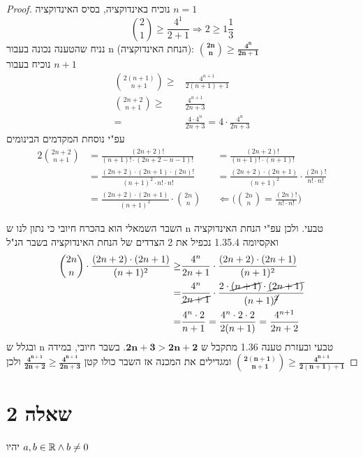\documentclass{article}
\begin{document}
	 \begin{proof}
		\nl
		נוכיח באינדוקציה, בסיס האינדוקציה
		$n = 1$
		\[
			{2 \choose 1} \geq \frac{4^1}{2+1} \Rightarrow 2 \geq 1 \frac{1}{3}
		\]
נניח שהטענה נכונה בעבור n (הנחת האינדוקציה):
		$\bm{{2n \choose n} \geq \frac{4^n}{2n+1}}$ \\
נוכיח בעבור $n + 1$
		\begin{align*}
			{2(n+1) \choose n+1} \geq &\frac{4^{n+1}}{2(n+1)+1} \\[1em]
			{2n + 2 \choose n + 1} \geq &\frac{4^{n+1}}{2n + 3} \\[1em]
			=&\frac{4 \cdot 4^n}{2n+3}
			=4 \cdot \frac{4^n}{2n+3}
		\end{align*}
עפ"י נוסחת המקדמים הבינומים
		\begin{alignat*}{2}
			{2n + 2 \choose n + 1} &=
			\frac{(2n+2)!}{(n+1)! \cdot (2n+2-n-1)!}
			&&=\frac{(2n+2)!}{(n+1)! \cdot (n+1)!} \\[1em]
			&=\frac{(2n+2) \cdot (2n+1) \cdot (2n)!}{(n+1)^2 \cdot n! \cdot n!}
			&&=\frac{(2n+2) \cdot (2n+1)}{(n+1)^2} \cdot \frac{(2n)!}{n! \cdot n!} \\[1em]
			&=\frac{(2n+2) \cdot (2n+1)}{(n+1)^2} \cdot {2n \choose n}
			&& \Leftarrow \bigg( {2n \choose n} = \frac{(2n)!}{n! \cdot n!} \bigg)
		\end{alignat*}

		השבר השמאלי הוא בהכרח חיובי כי נתון לנו ש n טבעי.
ולכן עפ"י הנחת האינדוקציה ואקסיומה 1.35.4 נכפיל את 2 הצדדים של הנחת האינדוקציה בשבר הנ"ל
		\begin{align*}
			{2n \choose n} \cdot \frac{(2n+2) \cdot (2n+1)}{(n+1)^2} \geq
			&\frac{4^n}{2n+1} \cdot \frac{(2n+2) \cdot (2n+1)}{(n+1)^2} \\
			=&\frac{4^n}{\cancel{2n+1}} \cdot \frac{2 \cdot \cancel{(n+1)} \cdot \cancel{(2n+1)}}{(n+1)\cancel{^2}} \\
			=&\frac{4^n \cdot 2}{n+1}
			=\frac{4^n \cdot 2 \cdot 2}{2(n+1)} =
			\frac{4^{n+1}}{2n+2}
		\end{align*}
		ובגלל ש n טבעי ובעזרת טענה 1.36 מתקבל ש
		$\bm{2n + 3 > 2n + 2}$.
		בשבר חיובי,
		במידה ומגדילים את המכנה אז השבר כולו קטן
		$\bm{\frac{4^{n+1}}{2n+2} \geq \frac{4^{n+1}}{2n+3}}$
		ולכן
		$\bm{{2(n+1) \choose n+1} \geq \frac{4^{n+1}}{2(n+1)+1}}$
	\end{proof}

	\pagebreak
	\section*{שאלה 2}
	יהיו
	$\displaystyle{a,b \in \mathbb{R}\land b \neq 0}$
\end{document}
